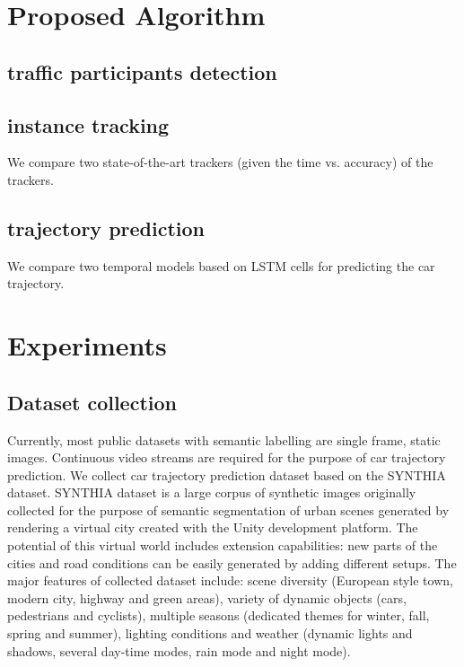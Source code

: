 \documentclass[10pt,twocolumn,letterpaper]{article}
\begin{document}
\section{Proposed Algorithm}

\subsection{traffic participants detection}


\subsection{instance tracking}

We compare two state-of-the-art trackers (given the time vs. accuracy) of the trackers.

\subsection{trajectory prediction}

We compare two temporal models based on LSTM cells for predicting the car trajectory.



\section{Experiments}

\subsection{Dataset collection}

Currently, most public datasets with semantic labelling are single frame, static images. Continuous video streams are required for the purpose of car trajectory prediction.
We collect car trajectory prediction dataset based on the SYNTHIA~\cite{ros2016synthia} dataset.
SYNTHIA dataset is a large corpus of synthetic images originally collected for the purpose of semantic segmentation of urban scenes generated by rendering a virtual city created with the Unity development platform.
The potential of this virtual world includes extension capabilities: new parts of the cities and road conditions can be easily generated by adding different setups. The major features of collected dataset include: scene diversity (European style town, modern city, highway and green areas), variety of dynamic objects (cars, pedestrians and cyclists), multiple seasons (dedicated themes for winter, fall, spring and summer), lighting conditions and weather (dynamic lights and shadows, several day-time modes, rain mode and night mode).
\end{document}
